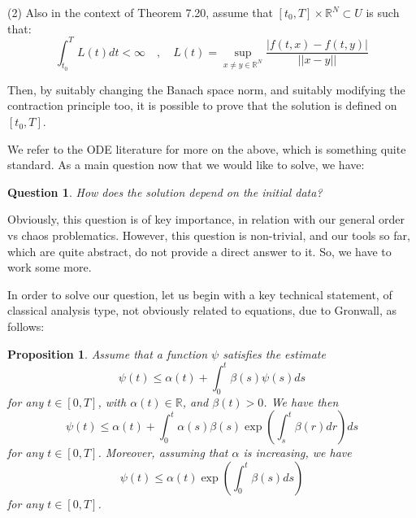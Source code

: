 \documentclass[12pt]{amsbook}
\newtheorem{proposition}[theorem]{Proposition}
\newtheorem{question}[theorem]{Question}
\begin{document}
\bigskip

(2) Also in the context of Theorem 7.20, assume that $[t_0,T]\times\mathbb R^N\subset U$ is such that:
$$\int_{t_0}^TL(t)dt<\infty\quad,\quad L(t)=\sup_{x\neq y\in\mathbb R^N}\frac{|f(t,x)-f(t,y)|}{||x-y||}$$

Then, by suitably changing the Banach space norm, and suitably modifying the contraction principle too, it is possible to prove that the solution is defined on $[t_0,T]$.

\bigskip

We refer to the ODE literature for more on the above, which is something quite standard. As a main question now that we would like to solve, we have:

\begin{question}
How does the solution depend on the initial data?
\end{question}

Obviously, this question is of key importance, in relation with our general order vs chaos problematics. However, this question is non-trivial, and our tools so far, which are quite abstract, do not provide a direct answer to it. So, we have to work some more.

\bigskip

In order to solve our question, let us begin with a key technical statement, of classical analysis type, not obviously related to equations, due to Gronwall, as follows:

\begin{proposition}
Assume that a function $\psi$ satisfies the estimate
$$\psi(t)\leq\alpha(t)+\int_0^t\beta(s)\psi(s)ds$$
for any $t\in[0,T]$, with $\alpha(t)\in\mathbb R$, and $\beta(t)>0$. We have then
$$\psi(t)\leq\alpha(t)+\int_0^t\alpha(s)\beta(s)\exp\left(\int_s^t\beta(r)dr\right)ds$$
for any $t\in[0,T]$. Moreover, assuming that $\alpha$ is increasing, we have
$$\psi(t)\leq\alpha(t)\exp\left(\int_0^t\beta(s)ds\right)$$
for any $t\in[0,T]$. 
\end{proposition}
\end{document}
